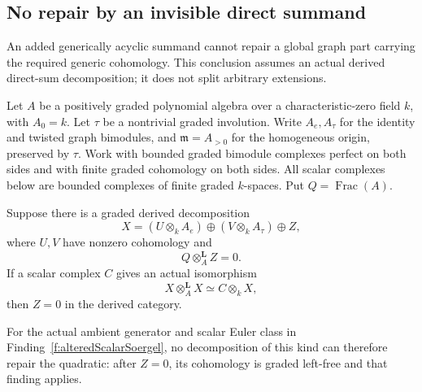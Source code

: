 \subsection{No repair by an invisible direct summand}

An added generically acyclic summand cannot repair a
global graph part carrying the required generic
cohomology. This conclusion assumes an actual derived
direct-sum decomposition; it does not split arbitrary
extensions.

Let \(A\) be a positively graded polynomial algebra
over a characteristic-zero field \(k\), with \(A_0=k\).
Let \(\tau\) be a nontrivial graded involution.
Write \(A_e,A_\tau\) for the identity and twisted
graph bimodules, and \(\mathfrak m=A_{>0}\) for the
homogeneous origin, preserved by \(\tau\).
Work with bounded graded bimodule complexes perfect
on both sides and with finite graded cohomology on
both sides. All scalar complexes below are bounded
complexes of finite graded \(k\)-spaces.
Put \(Q=\operatorname{Frac}(A)\).

\begin{finding}
\label{f:invisibleSummandNoGo}
Suppose there is a graded derived decomposition
\begin{equation}\label{eq:invisibleSummandDecomposition}
 X=(U\otimes_kA_e)\oplus(V\otimes_kA_\tau)\oplus Z,
\end{equation}
where \(U,V\) have nonzero cohomology and
\[
                         Q\otimes_A^{\mathbf L}Z=0.
\]
If a scalar complex \(C\) gives an actual isomorphism
\begin{equation}\label{eq:invisibleSummandQuadratic}
 X\otimes_A^{\mathbf L}X\simeq C\otimes_kX,
\end{equation}
then \(Z=0\) in the derived category.

For the actual ambient generator and scalar Euler
class in Finding~\ref{f:alteredScalarSoergel}, no
decomposition of this kind can therefore repair the
quadratic: after \(Z=0\), its cohomology is graded
left-free and that finding applies.
\end{finding}

